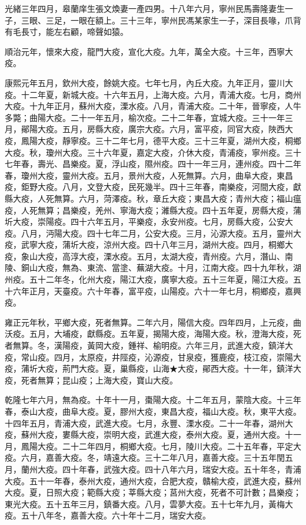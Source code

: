 \begin{pinyinscope}
光緒三年四月，皋蘭庠生張文煥妻一產四男。十八年六月，寧州民馬壽隆妻生一子，三眼、三足，一眼在額上。三十三年，寧州民馮某家生一子，深目長喙，爪背有毛長寸，能左右顧，啼聲如猿。

順治元年，懷來大疫，龍門大疫，宣化大疫。九年，萬全大疫。十三年，西寧大疫。

康熙元年五月，欽州大疫，餘姚大疫。七年七月，內丘大疫。九年正月，靈川大疫。十二年夏，新城大疫。十六年五月，上海大疫。六月，青浦大疫。七月，商州大疫。十九年正月，蘇州大疫，溧水疫。八月，青浦大疫。二十年，晉寧疫，人牛多斃；曲陽大疫。二十一年五月，榆次疫。二十二年春，宜城大疫。三十一年三月，鄖陽大疫。五月，房縣大疫，廣宗大疫。六月，富平疫，同官大疫，陜西大疫，鳳陽大疫，靜寧疫。三十二年七月，德平大疫。三十三年夏，湖州大疫，桐鄉大疫。秋，瓊州大疫。三十六年夏，嘉定大疫，介休大疫，青浦疫，寧州疫。三十七年春，壽光、昌樂疫。夏，浮山疫，隰州疫。四十一年三月，連州疫。四十二年春，瓊州大疫，靈州大疫。五月，景州大疫，人死無算。六月，曲阜大疫，東昌疫，鉅野大疫。八月，文登大疫，民死幾半。四十三年春，南樂疫，河間大疫，獻縣大疫，人死無算。六月，菏澤疫。秋，章丘大疫；東昌大疫；青州大疫；福山瘟疫，人死無算；昌樂疫，羌州、寧海大疫；濰縣大疫。四十五年夏，房縣大疫，蒲圻大疫，崇陽疫。四十六年五月，平樂疫，永安州疫。七月，房縣大疫，公安大疫。八月，沔陽大疫。四十七年二月，公安大疫。三月，沁源大疫。五月，靈州大疫，武寧大疫，蒲圻大疫，涼州大疫。四十八年三月，湖州大疫。四月，桐鄉大疫，象山大疫，高淳大疫，溧水疫。五月，太湖大疫，青州疫。六月，潛山、南陵、銅山大疫，無為、東流、當塗、蕪湖大疫。十月，江南大疫。四十九年秋，湖州疫。五十二年冬，化州大疫，陽江大疫，廣寧大疫。五十三年夏，陽江大疫。五十六年正月，天臺疫。六十年春，富平疫，山陽疫。六十一年七月，桐鄉疫，嘉興疫。

雍正元年秋，平鄉大疫，死者無算。二年六月，陽信大疫。四年四月，上元疫，曲沃疫。五月，大埔疫，獻縣疫。五年夏，揭陽大疫，海陽大疫。秋，澄海大疫，死者無算。冬，漢陽疫，黃岡大疫，鍾祥、榆明疫。六年三月，武進大疫，鎮洋大疫，常山疫。四月，太原疫，井陘疫，沁源疫，甘泉疫，獲鹿疫，枝江疫，崇陽大疫，蒲圻大疫，荊門大疫。夏，巢縣疫，山海★大疫，鄖西大疫。十一年，鎮洋大疫，死者無算；昆山疫；上海大疫，寶山大疫。

乾隆七年六月，無為疫。十年十一月，棗陽大疫。十二年五月，蒙陰大疫。十三年春，泰山大疫，曲阜大疫。夏，膠州大疫，東昌大疫，福山大疫。秋，東平大疫。十四年五月，青浦大疫，武進大疫。七月，永豐、溧水疫。二十一年春，湖州大疫，蘇州大疫，婁縣大疫，崇明大疫，武進大疫，泰州大疫。夏，通州大疫。十一月，鳳陽大疫。二十二年四月，桐鄉大疫。七月，陵川大疫。二十五年春，平定大疫。六月，嘉善大疫。冬，靖遠大疫。三十二年八月，嘉善大疫。三十五年閏五月，蘭州大疫。四十年春，武強大疫。四十八年六月，瑞安大疫。五十年冬，青浦大疫。五十一年春，泰州大疫，通州大疫，合肥大疫，贛榆大疫，武進大疫，蘇州大疫。夏，日照大疫；範縣大疫；莘縣大疫；莒州大疫，死者不可計數；昌樂疫；東光大疫。五十五年三月，鎮番大疫。八月，雲夢大疫。五十七年九月，黃梅大疫。五十八年冬，嘉善大疫。六十年十二月，瑞安大疫。


\end{pinyinscope}
